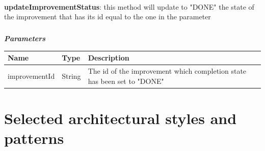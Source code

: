 						\paragraph{}
							\textbf{updateImprovementStatus}: this method will update to "DONE" the state of the improvement that has its id equal to the one in the parameter
							\subparagraph{}
							\vspace{-3mm}
							\textit{\textbf{Parameters}}
							\vspace{-2mm}
								\begin{table}[!h]
									\begin{tabular}{L{0.22\textwidth}L{0.15\textwidth}L{0.43\textwidth}}
										\toprule
										\textbf{Name} & \textbf{Type} & \textbf{Description} \\
										\midrule
								  		improvementId & String & The id of the improvement which completion state has been set to "DONE" \\
								 		\bottomrule
									\end{tabular}
								\end{table}
								
		\section{Selected architectural styles and patterns}
